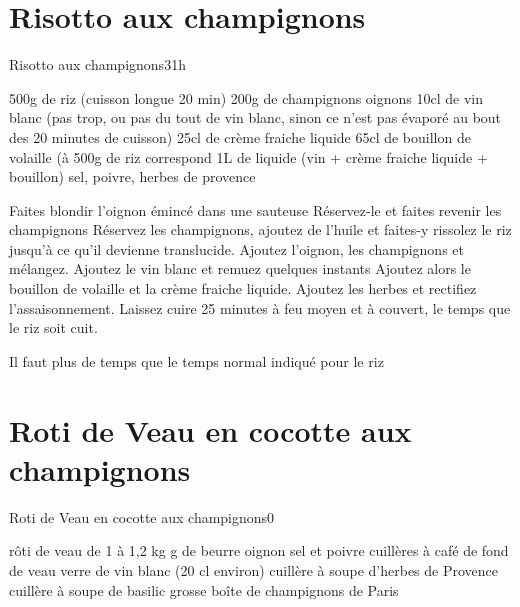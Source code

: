 {\section{Risotto aux champignons}
\begin{recette}{Risotto aux champignons}{3}{1h}{}
\begin{ingredients}
\ingredient 500g de riz (cuisson longue 20 min)
\ingredient 200g de champignons
 oignons
\ingredient 10cl de vin blanc (pas trop, ou pas du tout de vin blanc, sinon ce n'est pas évaporé au bout des 20 minutes de 
cuisson)
\ingredient 25cl de crème fraiche liquide
\ingredient 65cl de bouillon de volaille (à 500g de riz correspond 1L de liquide (vin + crème fraiche liquide + bouillon)
\ingredient sel, poivre, herbes de provence
\end{ingredients}

\begin{preparation}
\etape Faites blondir l'oignon émincé dans une sauteuse
\etape Réservez-le et faites revenir les champignons
\etape Réservez les champignons, ajoutez de l'huile et faites-y rissolez le riz jusqu'à ce qu'il devienne translucide.
\etape Ajoutez l'oignon, les champignons et mélangez.
\etape Ajoutez le vin blanc et remuez quelques instants 
\etape Ajoutez alors le bouillon de volaille et la crème fraiche liquide. 
\etape Ajoutez les herbes et rectifiez l'assaisonnement.
\etape Laissez cuire 25 minutes à feu moyen et à couvert, le temps que le riz soit cuit. 
\begin{remarque}
Il faut plus de temps que le temps normal indiqué pour le riz
\end{remarque}
\end{preparation}

\end{recette}

\section{Roti de Veau en cocotte aux champignons}
\begin{recette}{Roti de Veau en cocotte aux champignons}{0}{}{}
\begin{ingredients}
 rôti de veau de 1 à 1,2 kg
 g de beurre
 oignon
\ingredient sel et poivre
 cuillères à café de fond de veau
 verre de vin blanc (20 cl environ)
 cuillère à soupe d'herbes de Provence
 cuillère à soupe de basilic
 grosse boîte de champignons de Paris
\end{ingredients}


\end{recette}}
